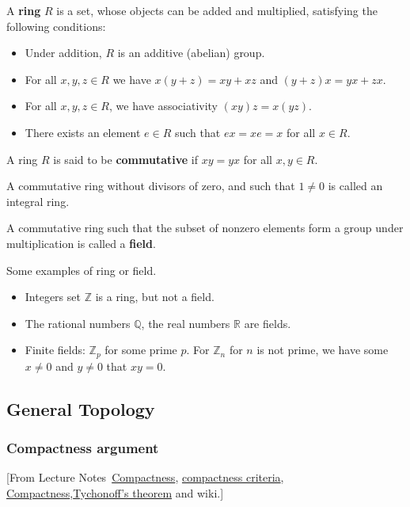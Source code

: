\begin{defn}[Ring]
    A \textbf{ring} $R$ is a set, whose objects can be added and multiplied, satisfying the following conditions:
    \begin{itemize}
        \item Under addition, $R$ is an additive (abelian) group.
        \item For all $x,y,z\in R$ we have $x(y+z)=xy +xz$ and $(y+z)x =yx + zx$.
        \item For all $x,y,z \in R$, we have associativity $(xy)z = x(yz)$.
        \item There exists an element $e\in R$ such that $ex = xe = x$ for all $x\in R$.
    \end{itemize}
\end{defn}

\begin{defn}
    A ring $R$ is said to be \textbf{commutative} if $xy = yx$ for all $x, y\in R$.
\end{defn}

\begin{defn}
    A commutative ring without divisors of zero, and such that $1 \neq 0$ is called an integral ring.
\end{defn}
\begin{defn}[Field]
    A commutative ring such that the subset of nonzero elements form a group under multiplication is called a \textbf{field}.
\end{defn}

\begin{exm}
    Some examples of ring or field.
    \begin{itemize}
        \item Integers set $\mathbb{Z}$ is a ring, but not a field.
        \item The rational numbers $\mathbb{Q}$, the real numbers $\mathbb{R}$ are fields.
        \item Finite fields: $\mathbb{Z}_p$ for some prime $p$. For $\mathbb{Z}_n$ for $n$ is not prime, we have some $x\neq 0$ and $y\neq 0$ that $xy=0$. 
    \end{itemize}
\end{exm}

\subsection{General Topology}
\subsubsection{Compactness argument}
[From Lecture Notes~\href{https://math.gmu.edu/~dwalnut/lec03.pdf}{Compactness}, \href{https://virtualmath1.stanford.edu/~conrad/diffgeomPage/handouts/compact.pdf}{compactness criteria}, \href{https://www.math.toronto.edu/ivan/mat327/docs/notes/16-compact.pdf}{Compactness},\href{https://www.math.toronto.edu/ivan/mat327/docs/notes/17-tychonoff.pdf}{Tychonoff's theorem} and wiki.]

